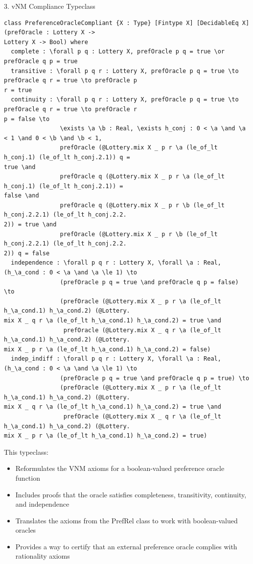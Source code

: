 \documentclass{article}
\theoremstyle{definition}
\begin{document}
3.  vNM Compliance Typeclass
\begin{lstlisting}
class PreferenceOracleCompliant {X : Type} [Fintype X] [DecidableEq X] (prefOracle : Lottery X ->
Lottery X -> Bool) where
  complete : \forall p q : Lottery X, prefOracle p q = true \or prefOracle q p = true
  transitive : \forall p q r : Lottery X, prefOracle p q = true \to prefOracle q r = true \to prefOracle p
r = true
  continuity : \forall p q r : Lottery X, prefOracle p q = true \to prefOracle q r = true \to prefOracle r
p = false \to
                \exists \a \b : Real, \exists h_conj : 0 < \a \and \a < 1 \and 0 < \b \and \b < 1,
                prefOracle (@Lottery.mix X _ p r \a (le_of_lt h_conj.1) (le_of_lt h_conj.2.1)) q =
true \and
                prefOracle q (@Lottery.mix X _ p r \a (le_of_lt h_conj.1) (le_of_lt h_conj.2.1)) =
false \and
                prefOracle q (@Lottery.mix X _ p r \b (le_of_lt h_conj.2.2.1) (le_of_lt h_conj.2.2.
2)) = true \and
                prefOracle (@Lottery.mix X _ p r \b (le_of_lt h_conj.2.2.1) (le_of_lt h_conj.2.2.
2)) q = false
  independence : \forall p q r : Lottery X, \forall \a : Real, (h_\a_cond : 0 < \a \and \a \le 1) \to
                (prefOracle p q = true \and prefOracle q p = false) \to
                (prefOracle (@Lottery.mix X _ p r \a (le_of_lt h_\a_cond.1) h_\a_cond.2) (@Lottery.
mix X _ q r \a (le_of_lt h_\a_cond.1) h_\a_cond.2) = true \and
                 prefOracle (@Lottery.mix X _ q r \a (le_of_lt h_\a_cond.1) h_\a_cond.2) (@Lottery.
mix X _ p r \a (le_of_lt h_\a_cond.1) h_\a_cond.2) = false)
  indep_indiff : \forall p q r : Lottery X, \forall \a : Real, (h_\a_cond : 0 < \a \and \a \le 1) \to
                (prefOracle p q = true \and prefOracle q p = true) \to
                (prefOracle (@Lottery.mix X _ p r \a (le_of_lt h_\a_cond.1) h_\a_cond.2) (@Lottery.
mix X _ q r \a (le_of_lt h_\a_cond.1) h_\a_cond.2) = true \and
                 prefOracle (@Lottery.mix X _ q r \a (le_of_lt h_\a_cond.1) h_\a_cond.2) (@Lottery.
mix X _ p r \a (le_of_lt h_\a_cond.1) h_\a_cond.2) = true)
\end{lstlisting}

This typeclass:
\begin{itemize}
  \item Reformulates the VNM axioms for a boolean-valued preference oracle function
  \item Includes proofs that the oracle satisfies completeness, transitivity, continuity, and independence
  \item Translates the axioms from the PrefRel class to work with boolean-valued oracles
  \item Provides a way to certify that an external preference oracle complies with rationality axioms
\end{itemize}
\end{document}
